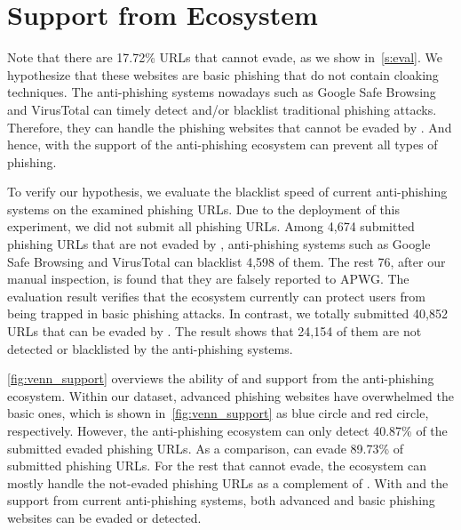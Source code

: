 \section{Support from Ecosystem}

Note that there are 17.72\% URLs that \spartacus cannot evade,
as we show in~\autoref{s:eval}.
We hypothesize that these websites are basic phishing that do not contain cloaking techniques.
The anti-phishing systems nowadays such as Google Safe Browsing and VirusTotal can timely detect and/or blacklist traditional phishing attacks.
Therefore, they can handle the phishing websites that cannot be evaded by \spartacus.
And hence, \spartacus with the support of the anti-phishing ecosystem can prevent all types of phishing.

To verify our hypothesis, we evaluate the blacklist speed of current anti-phishing systems on the examined phishing URLs.
Due to the deployment of this experiment, we did not submit all phishing URLs.
Among 4,674 submitted phishing URLs that are not evaded by \spartacus, anti-phishing systems such as Google Safe Browsing and VirusTotal can blacklist 4,598 of them.
The rest 76, after our manual inspection, is found that they are falsely reported to APWG.
The evaluation result verifies that the ecosystem currently can protect users from being trapped in basic phishing attacks.
In contrast, we totally submitted 40,852 URLs that can be evaded by \spartacus.
The result shows that 24,154 of them are not detected or blacklisted by the anti-phishing systems.



\autoref{fig:venn_support} overviews the ability of \spartacus and support from the anti-phishing ecosystem.
Within our dataset, advanced phishing websites have overwhelmed the basic ones, which is shown in~\autoref{fig:venn_support} as blue circle and red circle, respectively.
However, the anti-phishing ecosystem can only detect 40.87\% of the submitted evaded phishing URLs.
As a comparison, \spartacus can evade 89.73\% of submitted phishing URLs.
For the rest that \spartacus cannot evade,
the ecosystem can mostly handle the not-evaded phishing URLs as a complement of \spartacus.
With \spartacus and the support from current anti-phishing systems, 
both advanced and basic phishing websites can be evaded or detected.

